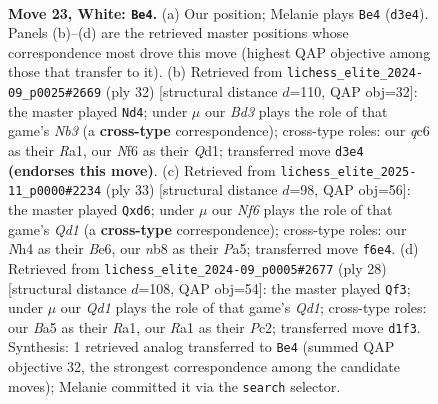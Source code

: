 \documentclass[11pt]{article}
\begin{document}
\clearpage

\begin{figure}[p]\centering
\begin{subfigure}{0.46\textwidth}\centering
\resizebox{\linewidth}{!}{%
\newchessgame
\chessboard[
  setfen={1nr5/rp1bbpk1/p1q1pN2/B5p1/7N/3BP3/PP3PPP/R2QR1K1 w - - 1 23},
  showmover=false,
  pgfstyle=straightmove, color=movearrow, markmove={d3-e4}
]}
\caption{}
\end{subfigure}\hfill
\begin{subfigure}{0.46\textwidth}\centering
\resizebox{\linewidth}{!}{%
\newchessgame
\chessboard[
  setfen={r2qr1k1/1bp2ppp/pp3b2/4n3/P4B2/1NP5/1P2BPPP/R2Q1RK1 w - - 2 17},
  showmover=false,
  pgfstyle=straightmove, color=movearrow, markmove={b3-d4}
]}
\caption{}
\end{subfigure}
\\[4pt]
\begin{subfigure}{0.46\textwidth}\centering
\resizebox{\linewidth}{!}{%
\newchessgame
\chessboard[
  setfen={r2qr1k1/5ppp/2pBb3/p2p4/N3n3/P4Q1P/1PP2PP1/R3RBK1 b - - 0 17},
  showmover=false,
  pgfstyle=straightmove, color=movearrow, markmove={d8-d6}
]}
\caption{}
\end{subfigure}\hfill
\begin{subfigure}{0.46\textwidth}\centering
\resizebox{\linewidth}{!}{%
\newchessgame
\chessboard[
  setfen={r4rk1/pp2npp1/2pb1q1p/4Nb2/3P4/3B3P/PBP2PP1/R2QR1K1 w - - 2 15},
  showmover=false,
  pgfstyle=straightmove, color=movearrow, markmove={d1-f3}
]}
\caption{}
\end{subfigure}
\caption{\textbf{Move 23, White: \texttt{Be4}.} (a) Our position; Melanie plays \texttt{Be4} (\texttt{d3e4}). Panels (b)--(d) are the retrieved master positions whose correspondence most drove this move (highest QAP objective among those that transfer to it). (b) Retrieved from \texttt{lichess\_elite\_2024-09\_p0025\#2669} (ply 32) [structural distance $d$=110, QAP obj=32]: the master played \texttt{Nd4}; under $\mu$ our \emph{Bd3} plays the role of that game's \emph{Nb3} (a \textbf{cross-type} correspondence); cross-type roles: our \emph{q}c6 as their \emph{R}a1, our \emph{N}f6 as their \emph{Q}d1; transferred move \texttt{d3e4} \textbf{(endorses this move)}. (c) Retrieved from \texttt{lichess\_elite\_2025-11\_p0000\#2234} (ply 33) [structural distance $d$=98, QAP obj=56]: the master played \texttt{Qxd6}; under $\mu$ our \emph{Nf6} plays the role of that game's \emph{Qd1} (a \textbf{cross-type} correspondence); cross-type roles: our \emph{N}h4 as their \emph{B}e6, our \emph{n}b8 as their \emph{P}a5; transferred move \texttt{f6e4}. (d) Retrieved from \texttt{lichess\_elite\_2024-09\_p0005\#2677} (ply 28) [structural distance $d$=108, QAP obj=54]: the master played \texttt{Qf3}; under $\mu$ our \emph{Qd1} plays the role of that game's \emph{Qd1}; cross-type roles: our \emph{B}a5 as their \emph{R}a1, our \emph{R}a1 as their \emph{P}c2; transferred move \texttt{d1f3}. Synthesis: 1 retrieved analog transferred to \texttt{Be4} (summed QAP objective 32, the strongest correspondence among the candidate moves); Melanie committed it via the \texttt{search} selector.}
\label{fig:thought-m44}
\end{figure}
\end{document}
